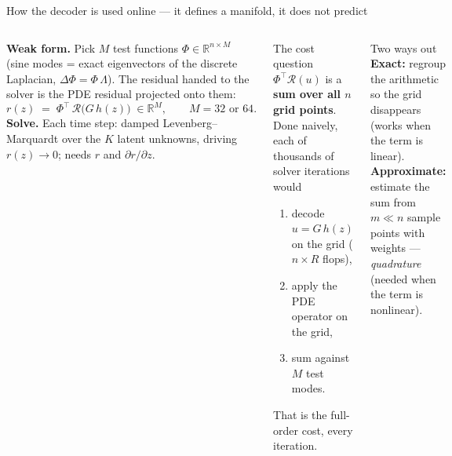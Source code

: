 \documentclass[10pt,aspectratio=169]{beamer}
\newcommand{\T}{^{\top}}
\newcommand{\R}{\mathbb{R}}
\begin{document}
\begin{frame}{How the decoder is used online --- it defines a manifold, it does not predict}
  \footnotesize
  \begin{columns}[T]
    \textbf{Weak form.} Pick $M$ test functions $\Phi\in\R^{n\times M}$ (sine modes = exact eigenvectors of the discrete Laplacian, $\Delta\Phi = \Phi\,\Lambda$). The residual handed to the solver is the PDE residual projected onto them:
    \[
      r(z) \;=\; \Phi\T\,\mathcal{R}\big(G\,h(z)\big)\;\in\R^{M},\qquad M = 32\text{ or }64 .
    \]
    \textbf{Solve.} Each time step: damped Levenberg--Marquardt over the $K$ latent unknowns, driving $r(z)\to0$; needs $r$ and $\partial r/\partial z$.
    \begin{block}{The cost question}
      $\Phi\T\mathcal{R}(u)$ is a \textbf{sum over all $n$ grid points}. Done naively, each of thousands of solver iterations would
      \begin{enumerate}
        \item decode $u=G\,h(z)$ on the grid ($n\times R$ flops),
        \item apply the PDE operator on the grid,
        \item sum against $M$ test modes.
      \end{enumerate}
      That is the full-order cost, every iteration.
    \end{block}
    \begin{block}{Two ways out}
      \textbf{Exact:} regroup the arithmetic so the grid disappears (works when the term is linear).\\
      \textbf{Approximate:} estimate the sum from $m\ll n$ sample points with weights --- \emph{quadrature} (needed when the term is nonlinear).
    \end{block}
  \end{columns}
\end{frame}

\end{document}
